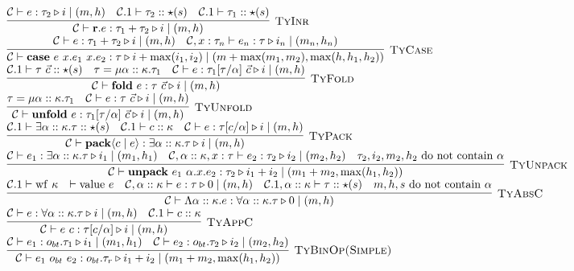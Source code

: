 \documentclass[fleqn]{article}
\begin{document}
\[\begin{array}{l}
	\infer[\textsc{TyInr}]{\jtygc{\mathcal{C} }{ \mathbf{r}.e }{ \tau_1 + \tau_2 }{ i }{ m}{h}}{\jtygc{\mathcal{C} }{ e }{ \tau_2 }{ i }{ m }{h} & \mathcal{C}.1 \vdash \tau_2 :: \star(s) & \mathcal{C}.1 \vdash \tau_1 :: \star(s)} \\
	\infer[\textsc{TyCase}]{\jtygc{\mathcal{C} }{ \mathbf{case}~e~x.e_1~x.e_2 }{ \tau }{ i + \max(i_1,i_2) }{ m + \max(m_1,m_2)}{\max(h,h_1,h_2)}}{\jtygc{\mathcal{C}}{e}{ \tau_1 + \tau_2 }{ i }{ m}{h} & \jtygc{\mathcal{C},x:\tau_n }{ e_n }{ \tau }{ i_n }{ m_n}{h_n}} \\
	\infer[\textsc{TyFold}]{\jtygc{\mathcal{C} }{ \mathbf{fold}~e }{ \tau~\vec{c} }{ i }{ m}{h}}{\mathcal{C}.1 \vdash \tau~\vec{c} :: \star(s) & \tau = \mu \alpha :: \kappa. \tau_1 & \jtygc{\mathcal{C} }{ e }{\tau_1[\tau/\alpha]~\vec{c} }{ i }{ m}{h}} \\
	\infer[\textsc{TyUnfold}]{\jtygc{\mathcal{C} }{ \mathbf{unfold}~e }{ \tau_1[\tau/\alpha]~\vec{c} }{ i }{ m}{h}}{\tau = \mu \alpha :: \kappa. \tau_1 & \jtygc{\mathcal{C} }{ e }{ \tau~\vec{c} }{ i }{ m}{h}} \\
	\infer[\textsc{TyPack}]{\jtygc{\mathcal{C} }{ \mathbf{pack}\langle c \mid e \rangle }{ \exists \alpha :: \kappa. \tau }{ i }{ m}{h}}{\mathcal{C}.1 \vdash \exists \alpha :: \kappa. \tau :: \star(s) & \mathcal{C}.1 \vdash c :: \kappa & \jtygc{\mathcal{C} }{ e }{ \tau[c/\alpha] }{ i }{ m}{h}} \\
	\infer[\textsc{TyUnpack}]{\jtygc{\mathcal{C} }{ \mathbf{unpack}~e_1~\alpha.x.e_2 }{ \tau_2 }{ i_1 + i_2 }{ m_1 + m_2}{\max(h_1,h_2)}}{\jtygc{\mathcal{C} }{ e_1 }{ \exists \alpha :: \kappa. \tau }{ i_1 }{ m_1}{h_1} & \jtygc{\mathcal{C},\alpha::\kappa,x:\tau }{ e_2 }{ \tau_2 }{ i_2 }{ m_2}{h_2} & \tau_2,i_2,m_2,h_2~\mathrm{do~not~contain}~\alpha} \\
	\infer[\textsc{TyAbsC}]{\jtygc{\mathcal{C} }{ \Lambda \alpha :: \kappa. e }{\forall \alpha :: \kappa. \tau }{ 0 }{ m}{h}}{\mathcal{C}.1 \vdash \mathrm{wf}~\kappa & \vdash \mathrm{value}~e & \jtygc{\mathcal{C},\alpha :: \kappa }{ e }{ \tau }{ 0 }{ m }{h} & \mathcal{C}.1,\alpha :: \kappa \vdash \tau :: \star(s) & m,h,s~\mathrm{do~not~contain}~\alpha} \\
	\infer[\textsc{TyAppC}]{\jtygc{\mathcal{C} }{ e~c }{\tau[c/\alpha] }{ i }{ m}{h}}{\jtygc{\mathcal{C} }{ e }{\forall \alpha :: \kappa. \tau }{ i }{ m}{h} & \mathcal{C}.1 \vdash c :: \kappa} \\
	\infer[\textsc{TyBinOp(Simple)}]{\jtygc{\mathcal{C} }{ e_1~o_{bt}~e_2 }{o_{bt}.\tau_r }{ i_1 + i_2 }{ m_1 + m_2}{\max(h_1,h_2)}}{\jtygc{\mathcal{C} }{ e_1 }{ o_{bt}.\tau_1 }{ i_1 }{ m_1}{h_1} & \jtygc{\mathcal{C} }{ e_2 }{ o_{bt}.\tau_2 }{ i_2 }{ m_2}{h_2}} \\

\end{array}\]
\end{document}
